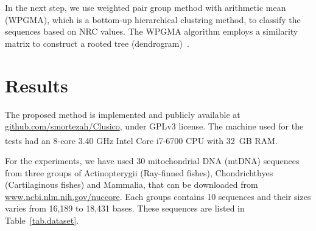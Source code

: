 \documentclass[extendedabs]{recpad2k}
\begin{document}
In the next step, we use weighted pair group method with arithmetic mean (WPGMA), which is a bottom-up hierarchical clustring method, to classify the sequences based on NRC values. The WPGMA algorithm employs a similarity matrix to construct a rooted tree (dendrogram)~\cite{sokal58a, clifford2011comparison}.


\section{Results}
The proposed method is implemented and publicly available at \url{github.com/smortezah/Clusico}, under GPLv3 license. The machine used for the tests had an 8-core 3.40 GHz Intel\textsuperscript{\scriptsize\textregistered} Core{\scriptsize\texttrademark} i7-6700 CPU with 32~GB RAM.

For the experiments, we have used 30 mitochondrial DNA (mtDNA) sequences from three groups of Actinopterygii (Ray-finned fishes), Chondrichthyes (Cartilaginous fishes) and Mammalia, that can be downloaded from \url{www.ncbi.nlm.nih.gov/nuccore}. Each groups contains 10 sequences and their sizes varies from 16,189 to 18,431 bases. These sequences are listed in Table~\ref{tab.dataset}.
\end{document}
